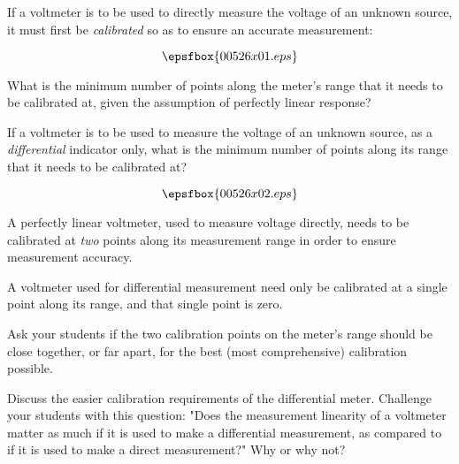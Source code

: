 

If a voltmeter is to be used to directly measure the voltage of an unknown source, it must first be {\it calibrated} so as to ensure an accurate measurement:

$$\epsfbox{00526x01.eps}$$

What is the minimum number of points along the meter's range that it needs to be calibrated at, given the assumption of perfectly linear response?

\vskip 10pt

If a voltmeter is to be used to measure the voltage of an unknown source, as a {\it differential} indicator only, what is the minimum number of points along its range that it needs to be calibrated at?

$$\epsfbox{00526x02.eps}$$







A perfectly linear voltmeter, used to measure voltage directly, needs to be calibrated at {\it two} points along its measurement range in order to ensure measurement accuracy.

\vskip 10pt

A voltmeter used for differential measurement need only be calibrated at a single point along its range, and that single point is zero.







Ask your students if the two calibration points on the meter's range should be close together, or far apart, for the best (most comprehensive) calibration possible.

Discuss the easier calibration requirements of the differential meter.  Challenge your students with this question: "Does the measurement linearity of a voltmeter matter as much if it is used to make a differential measurement, as compared to if it is used to make a direct measurement?"  Why or why not?



